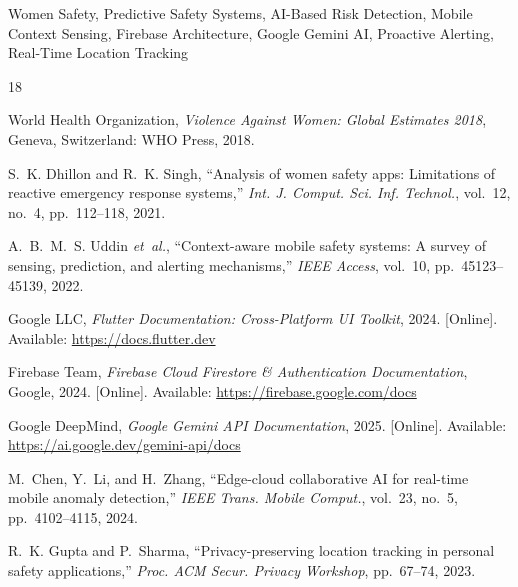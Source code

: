 \documentclass[conference,twocolumn]{IEEEtran}
\begin{document}
\begin{IEEEkeywords}
Women Safety, Predictive Safety Systems, AI-Based Risk Detection, Mobile Context Sensing, Firebase Architecture, Google Gemini AI, Proactive Alerting, Real-Time Location Tracking
\end{IEEEkeywords}













\begin{thebibliography}{18}

World Health Organization, \emph{Violence Against Women: Global Estimates 2018}, Geneva, Switzerland: WHO Press, 2018.

S.~K. Dhillon and R.~K. Singh, ``Analysis of women safety apps: Limitations of reactive emergency response systems,'' \emph{Int. J. Comput. Sci. Inf. Technol.}, vol.~12, no.~4, pp.~112--118, 2021.

A.~B.~M.~S. Uddin \emph{et~al.}, ``Context-aware mobile safety systems: A survey of sensing, prediction, and alerting mechanisms,'' \emph{IEEE Access}, vol.~10, pp.~45123--45139, 2022.

Google LLC, \emph{Flutter Documentation: Cross-Platform UI Toolkit}, 2024. [Online]. Available: \url{https://docs.flutter.dev}

Firebase Team, \emph{Firebase Cloud Firestore \& Authentication Documentation}, Google, 2024. [Online]. Available: \url{https://firebase.google.com/docs}

Google DeepMind, \emph{Google Gemini API Documentation}, 2025. [Online]. Available: \url{https://ai.google.dev/gemini-api/docs}

M.~Chen, Y.~Li, and H.~Zhang, ``Edge-cloud collaborative AI for real-time mobile anomaly detection,'' \emph{IEEE Trans. Mobile Comput.}, vol.~23, no.~5, pp.~4102--4115, 2024.

R.~K. Gupta and P.~Sharma, ``Privacy-preserving location tracking in personal safety applications,'' \emph{Proc. ACM Secur. Privacy Workshop}, pp.~67--74, 2023.


\end{thebibliography}
\end{document}
